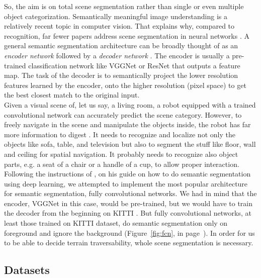 \documentclass[12pt,a4paper,table,dvipsnames,tikz]{report}
\newcommand{\term}{\textit}
\newcommand{\acronym}{\MakeUppercase}
\newcommand{\bl}[1]{{\hypersetup{linkcolor=blue}#1}}
\begin{document}
	So, the aim is on total scene segmentation rather than single or even multiple object 
	categorization. Semantically meaningful image understanding is a relatively recent topic 
	in computer vision. That explains why, compared to recognition, far fewer papers address 
	scene segmentation in neural networks \cite{Wang}. A general semantic segmentation 
	architecture can be broadly thought of as an \term{encoder network} followed by a 
	\term{decoder network} \citep{Le}. The encoder is usually a pre-trained classification 
	network like VGGNet or ResNet that outputs a feature map. The task of the decoder is 
	to semantically project the lower resolution features learned by the encoder, onto the 
	higher resolution (pixel space) to get the best closest match to the original input.
	\\
	
	Given a visual scene of, let us say, a living room, a robot equipped with 
	a trained convolutional network can accurately predict the scene category. However, to 
	freely navigate in the scene and manipulate the objects inside, the robot has far more 
	information to digest \citep{Zhou_sem}. It needs to recognize and localize not only the 
	objects like sofa, table, and television but also to segment the stuff like floor, 
	wall and ceiling for spatial navigation. It probably needs to recognize also object parts, 
	e.g. a seat of a chair or a handle of a cup, to allow proper interaction.
	\\
	
	Following the instructions of \citet{Le}, on his guide on how to do semantic segmentation 
	using deep learning, we attempted to implement the most popular 
	architecture for semantic segmentation, fully convolutional networks. We had in mind 
	that the encoder, VGGNet in this case, would be pre-trained, but we would have to 
	train the decoder from the beginning on \acronym{kitti} \citep{kitti}. But fully 
	convolutional networks, at least those trained on \acronym{kitti} dataset, do semantic 
	segmentation only on foreground and ignore the background (Figure~\bl{\ref{fig:fcn}}, 
	in page~\bl{\pageref{fig:fcn}}). In 
	order for us to be able to decide terrain traversability, whole scene segmentation is 
	necessary.
	\\
	
	
	\subsection{Datasets}
	\label{sec:fg:nn:sets}
	
\end{document}
